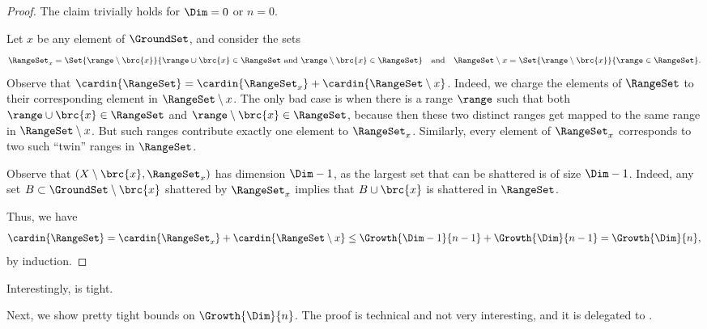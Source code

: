 \begin{proof}
    The claim trivially holds for $\Dim=0$ or $n=0$.
    
    Let $x$ be any element of $\GroundSet$, and consider the sets
    \begin{equation*}
        \RangeSet_x%
        =%
        \Set{ \range \setminus \brc{x} }%
        {\bigl. \range \cup \brc{x} \in \RangeSet \text{ and }%
           \range \setminus \brc{x} \in \RangeSet}%
        \quad\text{and}\quad%
        \RangeSet \setminus x%
        =%
        \Set{ \range
           \setminus \brc{x} }{ \bigl. \range \in \RangeSet}.
    \end{equation*}
    Observe that $\cardin{\RangeSet} = \cardin{\RangeSet_x} +
    \cardin{\RangeSet \setminus x}$. Indeed, we charge the elements of
    $\RangeSet$ to their corresponding element in $\RangeSet\setminus
    x$.  The only bad case is when there is a range $\range$ such that
    both $\range\cup \brc{x} \in \RangeSet$ and $\range\setminus
    \brc{x} \in \RangeSet$, because then these two distinct ranges get
    mapped to the same range in $\RangeSet \setminus x$. But such
    ranges contribute exactly one element to $\RangeSet_x$. Similarly,
    every element of $\RangeSet_x$ corresponds to two such ``twin''
    ranges in $\RangeSet$.
    
    Observe that $( X \setminus \brc{x}, \RangeSet_x)$ has \VC{}
    dimension $\Dim-1$, as the largest set that can be shattered is of
    size $\Dim-1$.  Indeed, any set $B \subset \GroundSet \setminus
    \brc{x}$ shattered by $\RangeSet_x$ implies that $B \cup \brc{x}$
    is shattered in $\RangeSet$.
    
    Thus, we have
    \begin{equation*}
        \cardin{\RangeSet}%
        =%
        \cardin{\RangeSet_x} + \cardin{\RangeSet
           \setminus x} \leq \Growth{\Dim-1}{n-1} +
        \Growth{\Dim}{n-1}%
        =%
        \Growth{\Dim}{n},        
    \end{equation*}
    by induction.
\end{proof}



Interestingly,  is tight.

Next, we show pretty tight bounds on $\Growth{\Dim}{n}$.  The proof is
technical and not very interesting, and it is delegated to
.


